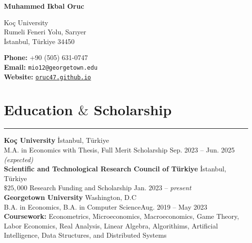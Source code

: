 \documentclass[a4paper,10pt]{article}
\newcommand{\HRule}{\rule{\linewidth}{0.5mm}}
\begin{document}
{\LARGE \textbf{Muhammed Ikbal Oruc}}
\vspace{10pt}

\noindent
\begin{spacing}{2}
    \begin{minipage}[t]{0.5\textwidth} %
        Koç University \\
        Rumeli Feneri Yolu, Sarıyer\\
        İstanbul, Türkiye 34450
    \end{minipage}%
    \begin{minipage}[t]{0.5\textwidth} %
        \raggedleft %
        \textbf{Phone:} +90 (505) 631-0747 \\
        \textbf{Email:} \texttt{mio12@georgetown.edu} \\
        \textbf{Website:} \href{https://oruc47.github.io}{\texttt{oruc47.github.io}}\\
    \end{minipage}
\end{spacing}

\vspace{-10pt}



\section*{Education $\&$ Scholarship}
\vspace{-15pt}
\HRule

\textbf{Koç University} \hfill İstanbul, Türkiye\\
M.A. in Economics with Thesis, Full Merit Scholarship \hfill Sep. 2023 – Jun. 2025 \emph{(expected)}\\[5pt]

\textbf{Scientific and Technological Research Council of Türkiye} \hfill İstanbul, Türkiye\\
$\$25,000$ Research Funding and Scholarship \hfill Jan. 2023 – \emph{present}\\[5pt]


\textbf{Georgetown University} \hfill Washington, D.C \\
B.A. in Economics, B.A. in Computer Science\hfill Aug. 2019 – May 2023 \\[5pt]

\textbf{Coursework:} Econometrics, Microeconomics, 
Macroeconomics, Game Theory, Labor Economics,
Real Analysis, Linear Algebra, Algorithims, Artificial 
Intelligence, Data Structures, and Distributed Systems
\end{document}
